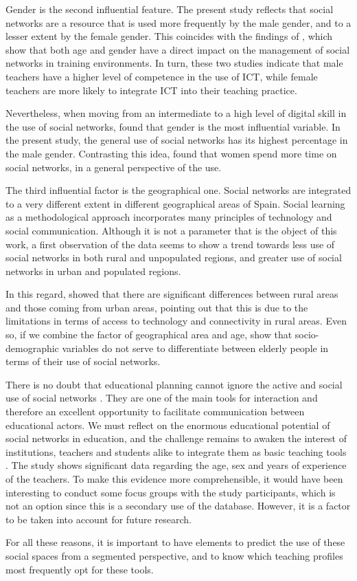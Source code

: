 \documentclass{textolivre}
\begin{document}
Gender is the second influential feature. The present study reflects that social networks are a resource that is used more frequently by the male gender, and to a lesser extent by the female gender. This coincides with the findings of \textcite{suarez2013,almerich2011}, which show that both age and gender have a direct impact on the management of social networks in training environments. In turn, these two studies indicate that male teachers have a higher level of competence in the use of ICT, while female teachers are more likely to integrate ICT into their teaching practice.

Nevertheless, when moving from an intermediate to a high level of digital skill in the use of social networks, \textcite{mayor2019} found that gender is the most influential variable. In the present study, the general use of social networks has its highest percentage in the male gender. Contrasting this idea, \textcite{cruz2016} found that women spend more time on social networks, in a general perspective of the use.

The third influential factor is the geographical one. Social networks are integrated to a very different extent in different geographical areas of Spain. Social learning as a methodological approach incorporates many principles of technology and social communication. Although it is not a parameter that is the object of this work, a first observation of the data seems to show a trend towards less use of social networks in both rural and unpopulated regions, and greater use of social networks in urban and populated regions. 

In this regard, \textcite{alcivar2017} showed that there are significant differences between rural areas and those coming from urban areas, pointing out that this is due to the limitations in terms of access to technology and connectivity in rural areas. Even so, if we combine the factor of geographical area and age, \textcite{peral2015} show that socio-demographic variables do not serve to differentiate between elderly people in terms of their use of social networks.

There is no doubt that educational planning cannot ignore the active and social use of social networks \cite{duart2009}. They are one of the main tools for interaction and therefore an excellent opportunity to facilitate communication between educational actors. We must reflect on the enormous educational potential of social networks in education, and the challenge remains to awaken the interest of institutions, teachers and students alike to integrate them as basic teaching tools \cite{casteneda2010}. The study shows significant data regarding the age, sex and years of experience of the teachers. To make this evidence more comprehensible, it would have been interesting to conduct some focus groups with the study participants, which is not an option since this is a secondary use of the database. However, it is a factor to be taken into account for future research.

For all these reasons, it is important to have elements to predict the use of these social spaces from a segmented perspective, and to know which teaching profiles most frequently opt for these tools.

\begin{english}
\printbibliography\label{sec-bib}
\end{english}
\end{document}
